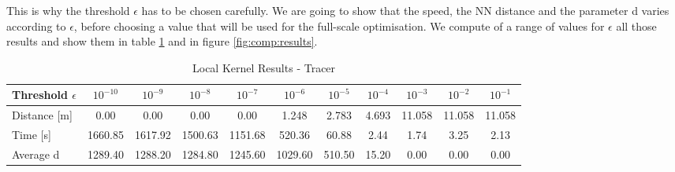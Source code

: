 This is why the threshold $\epsilon$ has to be chosen carefully. We are going to show that the speed, the NN distance and the parameter d varies according to $\epsilon$, before choosing a value that will be used for the full-scale optimisation. We compute of a range of values for $\epsilon$ all those results and show them in table \ref{tab:comp:results} and in figure \ref{fig:comp:results}. \\



\begin{table}[h!]
\centering
\scriptsize
\begin{tabular}{l|cccccccccc}
  \toprule
  Threshold $\epsilon$ & $10^{-10} $ &  $10^{-9}$ & $10^{-8}$ & $10^{-7}$ & $10^{-6}$ & $10^{-5}$ & $10^{-4}$ & $10^{-3}$ & $10^{-2}$ & $10^{-1}$ \\
    \midrule
  Distance [m]       &    0.00 &    0.00 &    0.00 &    0.00 &   1.248 &  2.783 & 4.693 & 11.058 & 11.058 & 11.058 \\
Time [s]       & 1660.85 & 1617.92 & 1500.63 & 1151.68 &  520.36 &  60.88 &  2.44 &   1.74 &   3.25 &   2.13 \\
Average d & 1289.40 & 1288.20 & 1284.80 & 1245.60 & 1029.60 & 510.50 & 15.20 &   0.00 &   0.00 &   0.00 \\
  \bottomrule
\end{tabular}
\caption{Local Kernel Results - Tracer}
\label{tab:comp:results}
\end{table}

